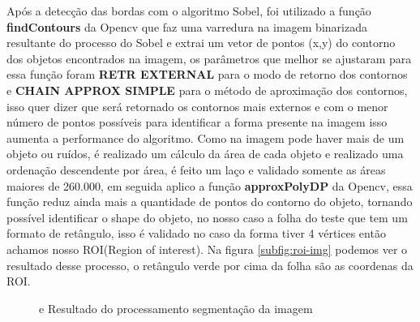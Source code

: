 Após a detecção das bordas com o algoritmo Sobel, foi utilizado a função \textbf{findContours} da Opencv que faz uma varredura na imagem binarizada resultante do processo do Sobel e extrai um vetor de pontos (x,y) do contorno dos objetos encontrados na imagem, os parâmetros que melhor se ajustaram para essa função foram \textbf{RETR EXTERNAL} para o modo de retorno dos contornos e \textbf{CHAIN APPROX SIMPLE} para o método de aproximação dos contornos, isso quer dizer que será retornado os contornos mais externos e com o menor número de pontos possíveis  para identificar a forma presente na imagem isso aumenta a performance do algoritmo. Como na imagem pode haver mais de um objeto ou ruídos, é realizado um cálculo da área de cada objeto e realizado uma ordenação  descendente por área, é feito um laço e validado somente as áreas maiores de 260.000,  em seguida aplico a função  \textbf{approxPolyDP } da Opencv, essa função reduz ainda mais a quantidade de pontos do contorno do objeto, tornando possível identificar o shape do objeto, no nosso caso a folha do teste que tem um formato de retângulo, isso é validado no caso da forma tiver 4 vértices então achamos nosso ROI(Region of interest). Na figura \ref{subfig:roi-img} podemos ver o resultado desse processo, o retângulo verde por cima da folha são as coordenas da ROI.


\begin{figure}[h]
 \centering
   \qquad
   \caption{{} e {} Resultado do processamento segmentação da imagem }
  \label{subfig:segmentacao}
\end{figure}

